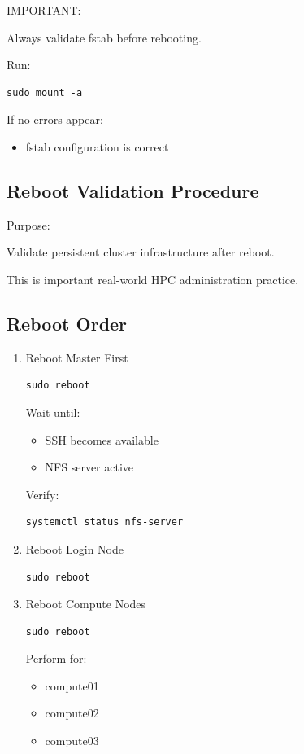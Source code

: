 \documentclass[11pt]{article}
\begin{document}
IMPORTANT:

Always validate fstab before rebooting.

Run:

\begin{verbatim}
sudo mount -a
\end{verbatim}

If no errors appear:
\begin{itemize}
\item fstab configuration is correct
\end{itemize}
\subsection{Reboot Validation Procedure}
\label{sec:org55306bb}

Purpose:

Validate persistent cluster infrastructure after reboot.

This is important real-world HPC administration practice.
\subsection{Reboot Order}
\label{sec:orgd7d2d83}
\begin{enumerate}
\item Reboot Master First
\label{sec:orga03d261}

\begin{verbatim}
sudo reboot
\end{verbatim}

Wait until:
\begin{itemize}
\item SSH becomes available
\item NFS server active
\end{itemize}

Verify:

\begin{verbatim}
systemctl status nfs-server
\end{verbatim}
\item Reboot Login Node
\label{sec:org760e57c}

\begin{verbatim}
sudo reboot
\end{verbatim}
\item Reboot Compute Nodes
\label{sec:org07a97fb}

\begin{verbatim}
sudo reboot
\end{verbatim}

Perform for:
\begin{itemize}
\item compute01
\item compute02
\item compute03
\end{itemize}
\end{enumerate}
\end{document}
